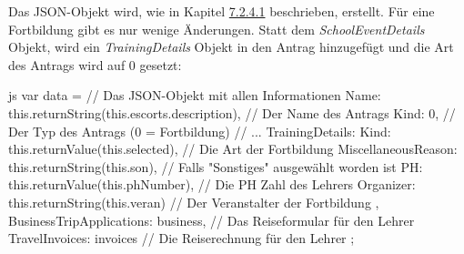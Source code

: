 Das JSON-Objekt wird, wie in Kapitel \hyperref[code_submit_data]{7.2.4.1} beschrieben, erstellt. Für eine Fortbildung gibt es nur wenige Änderungen.
Statt dem \textit{SchoolEventDetails} Objekt, wird ein \textit{TrainingDetails} Objekt in den Antrag hinzugefügt und die Art des Antrags wird auf 0 gesetzt:
\begin{code}{js}
var data = {		// Das JSON-Objekt mit allen Informationen
	Name: this.returnString(this.escorts.description),	// Der Name des Antrags
	Kind: 0,	// Der Typ des Antrags (0 = Fortbildung)
	// ...
	TrainingDetails: {
		Kind: this.returnValue(this.selected),	// Die Art der Fortbildung
		MiscellaneousReason: this.returnString(this.son),	// Falls "Sonstiges" ausgewählt worden ist
		PH: this.returnValue(this.phNumber),	// Die PH Zahl des Lehrers
		Organizer: this.returnString(this.veran)	// Der Veranstalter der Fortbildung
	},
	BusinessTripApplications: business,	// Das Reiseformular für den Lehrer
	TravelInvoices: invoices	// Die Reiserechnung für den Lehrer
};
\end{code}
~\\
\newpage
